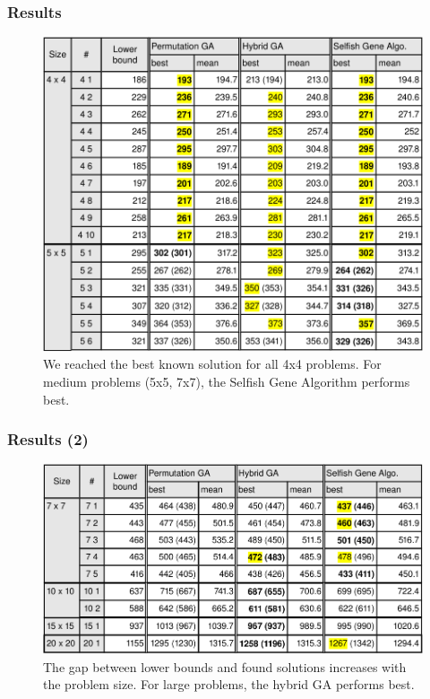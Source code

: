 
\begin{frame}
  \frametitle{Results}
	\vspace{-1.8cm}
\begin{figure}[htbp]
	\centering
	\hspace{1cm}
		\includegraphics[scale=.5]{images/results1.pdf}
	\caption{We reached the best known solution for all 4x4 problems. For medium problems (5x5, 7x7), the Selfish Gene Algorithm performs best.}
	\label{fig:label}
\end{figure}
\end{frame}


\begin{frame}
  \frametitle{Results (2)}

\begin{figure}[htbp]
	\centering
		\includegraphics[scale=.5]{images/results2.pdf}
	\caption{The gap between lower bounds and found solutions increases with the problem size. For large problems, the hybrid GA performs best.}
	\label{fig:label}
\end{figure}
\end{frame}

